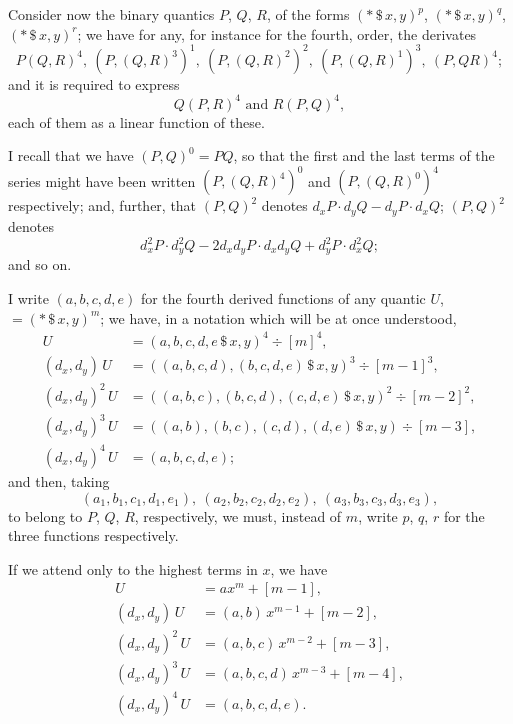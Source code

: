 \documentclass[11pt,a4paper]{article}
\begin{document}
\medskip

Consider now the binary quantics $P$, $Q$, $R$, of the forms $(*\,\$\,x, y)^{p}$, $(*\,\$\,x, y)^{q}$, $(*\,\$\,x, y)^{r}$; we have for any, for instance for the fourth, order, the derivates
\[
P(Q, R)^{4},\ (P, (Q, R)^{3})^{1},\ (P, (Q, R)^{2})^{2},\ (P, (Q, R)^{1})^{3},\ (P, QR)^{4};
\]
and it is required to express
\[
Q(P, R)^{4} \text{ and } R(P, Q)^{4},
\]
each of them as a linear function of these.

\newpage


I recall that we have $(P, Q)^{0} = PQ$, so that the first and the last terms of the series might have been written $(P, (Q, R)^{4})^{0}$ and $(P, (Q, R)^{0})^{4}$ respectively; and, further, that $(P, Q)^{2}$ denotes $d_{x}P\cdot d_{y}Q - d_{y}P\cdot d_{x}Q$; $(P, Q)^{2}$ denotes
\[
d_{x}^{2}P\cdot d_{y}^{2}Q - 2d_{x}d_{y}P\cdot d_{x}d_{y}Q + d_{y}^{2}P\cdot d_{x}^{2}Q;
\]
and so on.

\medskip

I write $(a, b, c, d, e)$ for the fourth derived functions of any quantic $U$, $=(*\,\$\,x, y)^{m}$; we have, in a notation which will be at once understood,
\begin{align*}
U &= (a, b, c, d, e\,\$\,x, y)^{4} \div [m]^{4},\\
(d_{x}, d_{y})\,U &= ((a, b, c, d), (b, c, d, e)\,\$\,x, y)^{3} \div [m-1]^{3},\\
(d_{x}, d_{y})^{2}\,U &= ((a, b, c), (b, c, d), (c, d, e)\,\$\,x, y)^{2} \div [m-2]^{2},\\
(d_{x}, d_{y})^{3}\,U &= ((a, b), (b, c), (c, d), (d, e)\,\$\,x, y) \div [m-3],\\
(d_{x}, d_{y})^{4}\,U &= (a, b, c, d, e);
\end{align*}
and then, taking
\[
(a_{1}, b_{1}, c_{1}, d_{1}, e_{1}),\ (a_{2}, b_{2}, c_{2}, d_{2}, e_{2}),\ (a_{3}, b_{3}, c_{3}, d_{3}, e_{3}),
\]
to belong to $P$, $Q$, $R$, respectively, we must, instead of $m$, write $p$, $q$, $r$ for the three functions respectively.

\medskip

If we attend only to the highest terms in $x$, we have
\begin{align*}
U &= a x^{m} + [m-1],\\
(d_{x}, d_{y})\,U &= (a, b)\,x^{m-1} + [m-2],\\
(d_{x}, d_{y})^{2}\,U &= (a, b, c)\,x^{m-2} + [m-3],\\
(d_{x}, d_{y})^{3}\,U &= (a, b, c, d)\,x^{m-3} + [m-4],\\
(d_{x}, d_{y})^{4}\,U &= (a, b, c, d, e).
\end{align*}
\end{document}
